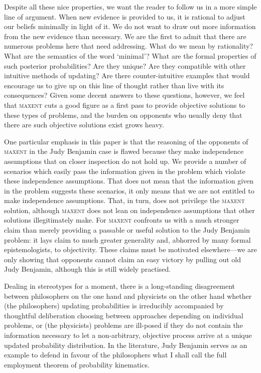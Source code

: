 \documentclass[smallextended]{svjour3}       %
\newcommand{\qnull}[1]{`#1'}
\begin{document}
Despite all these nice properties, we want the reader to follow us in
a more simple line of argument. When new evidence is provided to us,
it is rational to adjust our beliefs minimally in light of it. We do
not want to draw out more information from the new evidence than
necessary. We are the first to admit that there are numerous problems
here that need addressing. What do we mean by rationality? What are
the semantics of the word \qnull{minimal}? What are the formal
properties of such posterior probabilities? Are they unique? Are they
compatible with other intuitive methods of updating? Are there
counter-intuitive examples that would encourage us to give up on this
line of thought rather than live with its consequences? Given some
decent answers to these questions, however, we feel that
\textsc{maxent} cuts a good figure as a first pass to provide
objective solutions to these types of problems, and the burden on
opponents who usually deny that there are such objective solutions
exist grows heavy.

One particular emphasis in this paper is that the reasoning of the
opponents of \textsc{maxent} in the Judy Benjamin case is flawed
because they make independence assumptions that on closer inspection
do not hold up. We provide a number of scenarios which easily pass the
information given in the problem which violate these independence
assumptions. That does not mean that the information given in the
problem suggests these scenarios, it only means that we are not
entitled to make independence assumptions. That, in turn, does not
privilege the \textsc{maxent} solution, although \textsc{maxent} does
not lean on independence assumptions that other solutions
illegitimately make. For \textsc{maxent} confronts us with a much
stronger claim than merely providing a passable or useful solution to
the Judy Benjamin problem: it lays claim to much greater generality
and, abhorred by many formal epistemologists, to objectivity. These
claims must be motivated elsewhere---we are only showing that
opponents cannot claim an easy victory by pulling out old Judy
Benjamin, although this is still widely practised.

Dealing in stereotypes for a moment, there is a long-standing
disagreement between philosophers on the one hand and physicists on
the other hand whether (the philosophers) updating probabilities is
irreducibly accompanied by thoughtful deliberation choosing between
approaches depending on individual problems, or (the physicists)
problems are ill-posed if they do not contain the information
necessary to let a non-arbitrary, objective process arrive at a
unique updated probability distribution. In the literature, Judy
Benjamin serves as an example to defend in favour of the philosophers
what I shall call the full employment theorem of probability
kinematics.
\end{document}
